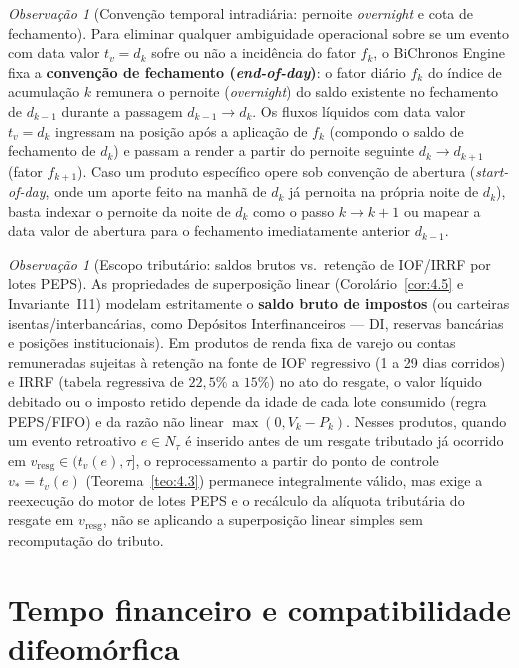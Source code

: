 \documentclass[11pt, a4paper]{article}
\theoremstyle{definition}
\theoremstyle{plain}
\theoremstyle{remark}
\newtheorem{observacao}[definicao]{Observação}
\begin{document}
\begin{observacao}[Convenção temporal intradiária: pernoite \emph{overnight} e cota de fechamento]\label{obs:1.5}
Para eliminar qualquer ambiguidade operacional sobre se um evento com data valor $t_v = d_k$ sofre ou não a incidência do fator $f_k$, o BiChronos Engine fixa a \textbf{convenção de fechamento (\emph{end-of-day})}: o fator diário $f_k$ do índice de acumulação $k$ remunera o pernoite (\emph{overnight}) do saldo existente no fechamento de $d_{k-1}$ durante a passagem $d_{k-1} \to d_k$. Os fluxos líquidos com data valor $t_v = d_k$ ingressam na posição após a aplicação de $f_k$ (compondo o saldo de fechamento de $d_k$) e passam a render a partir do pernoite seguinte $d_k \to d_{k+1}$ (fator $f_{k+1}$). Caso um produto específico opere sob convenção de abertura (\emph{start-of-day}, onde um aporte feito na manhã de $d_k$ já pernoita na própria noite de $d_k$), basta indexar o pernoite da noite de $d_k$ como o passo $k \to k+1$ ou mapear a data valor de abertura para o fechamento imediatamente anterior $d_{k-1}$.
\end{observacao}

\begin{observacao}[Escopo tributário: saldos brutos vs.\ retenção de IOF/IRRF por lotes PEPS]\label{obs:1.6}
As propriedades de superposição linear (Corolário~\ref{cor:4.5} e Invariante~I11) modelam estritamente o \textbf{saldo bruto de impostos} (ou carteiras isentas/interbancárias, como Depósitos Interfinanceiros --- DI, reservas bancárias e posições institucionais). Em produtos de renda fixa de varejo ou contas remuneradas sujeitas à retenção na fonte de IOF regressivo (1 a 29 dias corridos) e IRRF (tabela regressiva de $22{,}5\%$ a $15\%$) no ato do resgate, o valor líquido debitado ou o imposto retido depende da idade de cada lote consumido (regra PEPS/FIFO) e da razão não linear $\max(0, V_k - P_k)$. Nesses produtos, quando um evento retroativo $e \in N_\tau$ é inserido antes de um resgate tributado já ocorrido em $v_{\text{resg}} \in (t_v(e), \tau]$, o reprocessamento a partir do ponto de controle $v_* = t_v(e)$ (Teorema~\ref{teo:4.3}) permanece integralmente válido, mas exige a reexecução do motor de lotes PEPS e o recálculo da alíquota tributária do resgate em $v_{\text{resg}}$, não se aplicando a superposição linear simples sem recomputação do tributo.
\end{observacao}

\section{Tempo financeiro e compatibilidade difeomórfica}\label{sec:2}
\end{document}
